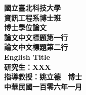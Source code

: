 \begin{center}
\begin{spacing}{1}
	\vspace*{10pt}					%
	\fontsize{24pt}{36pt}\selectfont 
	\bf 國立臺北科技大學\\
	資訊工程系博士班\\
	博士學位論文\\
	\vspace{95pt}					%
	\fontsize{24pt}{32pt}\selectfont 
	\bf 論文中文標題第一行\\論文中文標題第二行\\	
	\fontsize{22pt}{32pt}\selectfont 
	English Title\\
	\vspace{140pt}					%
	\fontsize{18pt}{18pt}\selectfont
	\bf 研究生：XXX\\
	\vspace{72pt}					%
	\bf 指導教授：姚立德　博士\\	
	\vspace{54pt}					%
	\bf 中華民國一百零六年一月
\end{spacing}
\end{center}